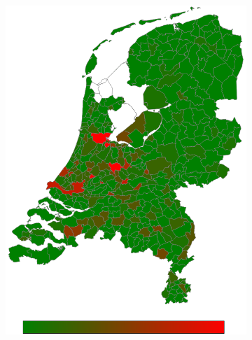 \documentclass[a4paper,twoside,11pt]{article}
\begin{document}
\begin{figure}[h]
\begin{subfigure}[b]{0.12\textwidth}
                \includegraphics[width=\textwidth]{Heatmaps/HeatMap8.png}
                \caption{}
                \label{fig:Maroccans}
        \end{subfigure} \newline
        \begin{subfigure}[b]{0.118\textwidth}

\end{subfigure}
\end{figure}
\end{document}
